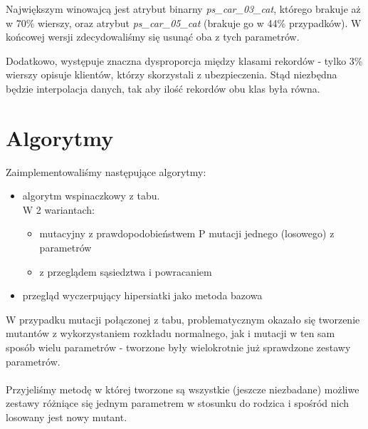 \documentclass[11pt]{article}
\begin{document}
Największym winowajcą jest atrybut binarny \textsl{ps\_car\_03\_cat}, którego brakuje aż w 70\% wierszy, oraz atrybut \textsl{ps\_car\_05\_cat} (brakuje go w 44\% przypadków). W końcowej wersji zdecydowaliśmy się usunąć oba z tych parametrów.

Dodatkowo, występuje znaczna dysproporcja między klasami rekordów - tylko 3\% wierszy opisuje klientów, którzy skorzystali z ubezpieczenia. Stąd niezbędna będzie interpolacja danych, tak aby ilość rekordów obu klas była równa.

\section{Algorytmy}
Zaimplementowaliśmy następujące algorytmy:
\begin{itemize}
	\item algorytm wspinaczkowy z tabu. \\ 
	W 2 wariantach:
		\begin{itemize}
			\item mutacyjny z prawdopodobieństwem P mutacji jednego (losowego) z parametrów
			\item z przeglądem sąsiedztwa i powracaniem
		\end{itemize}
	\item przegląd wyczerpujący hipersiatki jako metoda bazowa\\
\end{itemize}

W przypadku mutacji połączonej z tabu, problematycznym okazało się tworzenie mutantów z wykorzystaniem rozkładu normalnego, jak i mutacji w ten sam sposób wielu parametrów - tworzone były wielokrotnie już sprawdzone zestawy parametrów.\\\\
Przyjeliśmy metodę w której tworzone są wszystkie (jeszcze niezbadane) możliwe zestawy różniące się jednym parametrem w stosunku do rodzica i spośród nich losowany jest nowy mutant.
\end{document}

